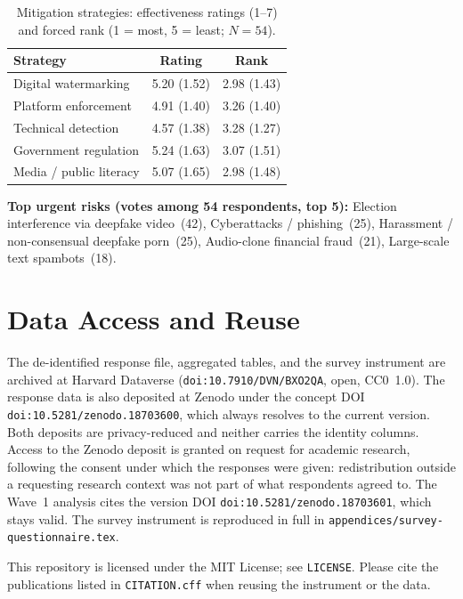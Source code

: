 \begin{table}[htbp]
\centering
\caption{Mitigation strategies: effectiveness ratings (1--7) and forced rank
(1 = most, 5 = least; $N=54$).}
\label{tab:desc-mitigation}
\begin{tabular}{lcc}
\toprule
\textbf{Strategy} & \textbf{Rating} & \textbf{Rank} \\
\midrule
Digital watermarking      & 5.20 (1.52) & 2.98 (1.43) \\
Platform enforcement      & 4.91 (1.40) & 3.26 (1.40) \\
Technical detection       & 4.57 (1.38) & 3.28 (1.27) \\
Government regulation     & 5.24 (1.63) & 3.07 (1.51) \\
Media / public literacy   & 5.07 (1.65) & 2.98 (1.48) \\
\bottomrule
\end{tabular}
\end{table}

\noindent\textbf{Top urgent risks (votes among 54 respondents, top 5):}
Election interference via deepfake video~(42),
Cyberattacks / phishing~(25),
Harassment / non-consensual deepfake porn~(25),
Audio-clone financial fraud~(21),
Large-scale text spambots~(18).

\section{Data Access and Reuse}
\label{sec:codebook-access}

The de-identified response file, aggregated tables, and the survey instrument
are archived at Harvard Dataverse
(\texttt{doi:10.7910/DVN/BXO2QA}, open, CC0~1.0). The response data is also
deposited at Zenodo under the concept DOI
\texttt{doi:10.5281/zenodo.18703600}, which always resolves to the current
version. Both deposits are privacy-reduced and neither carries the identity
columns. Access to the Zenodo deposit is granted on request for academic
research, following the consent under which the responses were given:
redistribution outside a requesting research context was not part of what
respondents agreed to. The Wave~1 analysis cites the version DOI
\texttt{doi:10.5281/zenodo.18703601}, which stays valid. The survey
instrument is reproduced in full in
\texttt{appendices/survey-questionnaire.tex}.

This repository is licensed under the MIT License; see \texttt{LICENSE}.
Please cite the publications listed in \texttt{CITATION.cff} when reusing
the instrument or the data.

